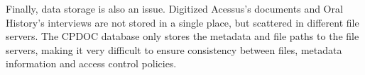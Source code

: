 
Finally, data storage is also an issue. Digitized Acessus's documents
and Oral History's interviews are not stored in a single place, but
scattered in different file servers. The CPDOC database only stores
the metadata and file paths to the file servers, making it very
difficult to ensure consistency between files, metadata information
and access control policies.


